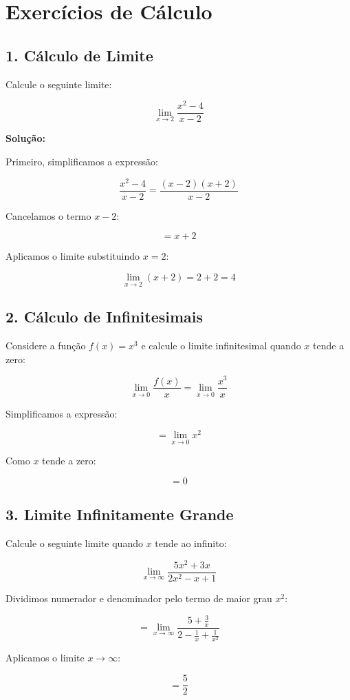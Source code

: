 \documentclass{article}
\begin{document}
\section*{Exercícios de Cálculo}

\subsection*{1. Cálculo de Limite}
Calcule o seguinte limite:

\[
\lim_{{x \to 2}} \frac{{x^2 - 4}}{{x - 2}}
\]

\textbf{Solução:}

Primeiro, simplificamos a expressão:

\[
\frac{{x^2 - 4}}{{x - 2}} = \frac{{(x-2)(x+2)}}{{x-2}}
\]

Cancelamos o termo \(x-2\):

\[
= x + 2
\]

Aplicamos o limite substituindo \(x = 2\):

\[
\lim_{{x \to 2}} (x + 2) = 2 + 2 = 4
\]

\subsection*{2. Cálculo de Infinitesimais}
Considere a função \( f(x) = x^3 \) e calcule o limite infinitesimal quando \( x \) tende a zero:

\[
\lim_{{x \to 0}} \frac{{f(x)}}{{x}} = \lim_{{x \to 0}} \frac{{x^3}}{{x}} 
\]

Simplificamos a expressão:

\[
= \lim_{{x \to 0}} x^2
\]

Como \( x \) tende a zero:

\[
= 0
\]

\subsection*{3. Limite Infinitamente Grande}
Calcule o seguinte limite quando \( x \) tende ao infinito:

\[
\lim_{{x \to \infty}} \frac{{5x^2 + 3x}}{{2x^2 - x + 1}}
\]

Dividimos numerador e denominador pelo termo de maior grau \(x^2\):

\[
= \lim_{{x \to \infty}} \frac{{5 + \frac{3}{x}}}{{2 - \frac{1}{x} + \frac{1}{x^2}}}
\]

Aplicamos o limite \( x \to \infty \):

\[
= \frac{5}{2}
\]
\end{document}
